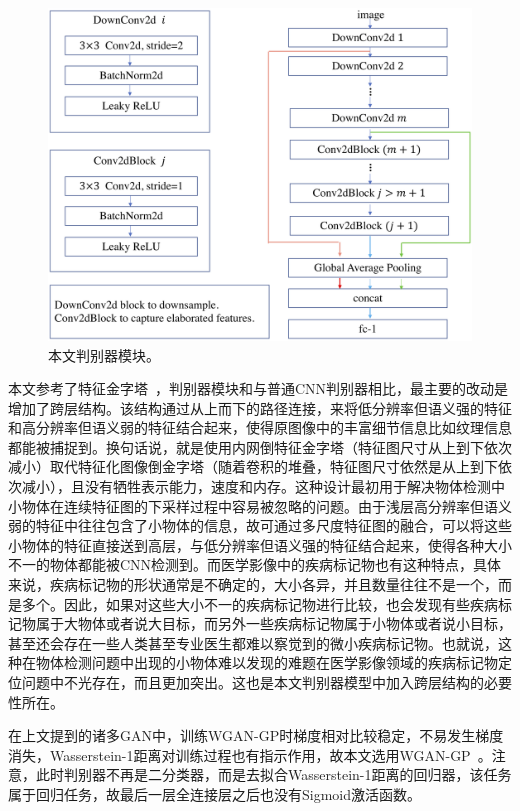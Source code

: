 \begin{figure}[h]
	\centering
	\includegraphics[width=1.0\textwidth]{figure/discrimintor_architecture.png}
	\caption[本文判别器模块]{本文判别器模块。}
	\label{fig:discrimintor_architecture}
\end{figure}

本文参考了特征金字塔~\cite{lin2017feature}，判别器模块和与普通CNN判别器相比，最主要的改动是增加了跨层结构。该结构通过从上而下的路径连接，来将低分辨率但语义强的特征和高分辨率但语义弱的特征结合起来，使得原图像中的丰富细节信息比如纹理信息都能被捕捉到。换句话说，就是使用内网倒特征金字塔（特征图尺寸从上到下依次减小）取代特征化图像倒金字塔（随着卷积的堆叠，特征图尺寸依然是从上到下依次减小），且没有牺牲表示能力，速度和内存。这种设计最初用于解决物体检测中小物体在连续特征图的下采样过程中容易被忽略的问题。由于浅层高分辨率但语义弱的特征中往往包含了小物体的信息，故可通过多尺度特征图的融合，可以将这些小物体的特征直接送到高层，与低分辨率但语义强的特征结合起来，使得各种大小不一的物体都能被CNN检测到。而医学影像中的疾病标记物也有这种特点，具体来说，疾病标记物的形状通常是不确定的，大小各异，并且数量往往不是一个，而是多个。因此，如果对这些大小不一的疾病标记物进行比较，也会发现有些疾病标记物属于大物体或者说大目标，而另外一些疾病标记物属于小物体或者说小目标，甚至还会存在一些人类甚至专业医生都难以察觉到的微小疾病标记物。也就说，这种在物体检测问题中出现的小物体难以发现的难题在医学影像领域的疾病标记物定位问题中不光存在，而且更加突出。这也是本文判别器模型中加入跨层结构的必要性所在。

在上文提到的诸多GAN中，训练WGAN-GP时梯度相对比较稳定，不易发生梯度消失，Wasserstein-1距离对训练过程也有指示作用，故本文选用WGAN-GP~\cite{gulrajani2017improved}。注意，此时判别器不再是二分类器，而是去拟合Wasserstein-1距离的回归器，该任务属于回归任务，故最后一层全连接层之后也没有Sigmoid激活函数。

